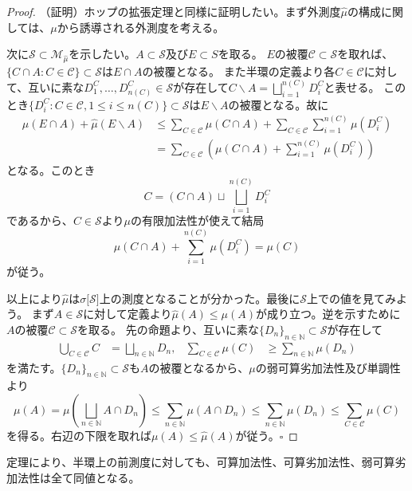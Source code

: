 \documentclass[../root.tex]{subfiles}
\begin{document}
\begin{proof}
（証明）ホップの拡張定理と同様に証明したい。まず外測度$ \widehat{\mu} $の構成に関しては、$ \mu $から誘導される外測度を考える。

次に$ \mathscr{S}\subset\mathscr{M}_{\widehat{\mu}} $を示したい。$ A\subset\mathscr{S} $及び$ E\subset S $を取る。
$ E $の被覆$ \mathscr{C}\subset\mathscr{S} $を取れば、$ \lbrace C\cap A : C\in\mathscr{C} \rbrace\subset\mathscr{S} $は$ E\cap A $の被覆となる。
また半環の定義より各$ C\in\mathscr{C} $に対して、互いに素な$ D^{C}_{1}, \dotsc, D^{C}_{n( C )}\in\mathscr{S} $が存在して$ C\backslash A=\bigsqcup_{i=1}^{n( C )}D^{C}_{i} $と表せる。
このとき$ \lbrace D^{C}_{i} : C\in\mathscr{C}, 1\le i \le n( C ) \rbrace\subset\mathscr{S} $は$ E\backslash A $の被覆となる。故に
\begin{align*}
\widehat{\mu}( E\cap A )+\widehat{\mu}( E\backslash A )&\le\sum_{C\in\mathscr{C}}\mu( C\cap A )+\sum_{C\in\mathscr{C}}\sum_{i=1}^{n( C )}\mu( D^{C}_{i} ) \\
&=\sum_{C\in\mathscr{C}}\left( \mu( C\cap A )+\sum_{i=1}^{n( C )}\mu( D^{C}_{i} ) \right)
\end{align*}
となる。このとき
\[ C=( C\cap A )\sqcup\bigsqcup_{i=1}^{n( C )}D^{C}_{i} \]
であるから、$ C\in\mathscr{S} $より$ \mu $の有限加法性が使えて結局
\[ \mu( C\cap A )+\sum_{i=1}^{n( C )}\mu( D^{C}_{i} )=\mu( C ) \]
が従う。

以上により$ \widehat{\mu} $は$ \sigma\lbrack \mathscr{S} \rbrack $上の測度となることが分かった。最後に$ \mathscr{S} $上での値を見てみよう。
まず$ A\in\mathscr{S} $に対して定義より$ \widehat{\mu}( A )\le\mu( A ) $が成り立つ。逆を示すために$ A $の被覆$ \mathscr{C}\subset\mathscr{S} $を取る。
先の命題より、互いに素な$ \lbrace D_{n} \rbrace_{n\in\mathbb{N}}\subset\mathscr{S} $が存在して
\begin{align*}
\bigcup_{C\in\mathscr{C}}C&=\bigsqcup_{n\in\mathbb{N}}D_{n}, & \sum_{C\in\mathscr{C}}\mu( C )&\ge\sum_{n\in\mathbb{N}}\mu( D_{n} )
\end{align*}
を満たす。$ \lbrace D_{n} \rbrace_{n\in\mathbb{N}}\subset\mathscr{S} $も$ A $の被覆となるから、$ \mu $の弱可算劣加法性及び単調性より
\[ \mu( A ) = \mu\left( \bigsqcup_{n\in\mathbb{N}}A\cap D_{n} \right) \le \sum_{n\in\mathbb{N}}\mu( A\cap D_{n} ) \le \sum_{n\in\mathbb{N}}\mu( D_{n} ) \le \sum_{C\in\mathscr{C}}\mu( C ) \]
を得る。右辺の下限を取れば$ \mu( A )\le\widehat{\mu}( A ) $が従う。$ \square $
\end{proof}

定理により、半環上の前測度に対しても、可算加法性、可算劣加法性、弱可算劣加法性は全て同値となる。
\end{document}
